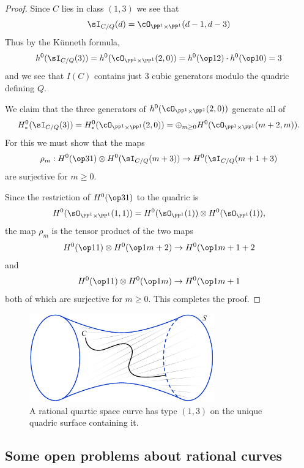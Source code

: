 \begin{proof}
Since $C$ lies in class $(1,3)$ we see that 
$$
\sI_{C/Q}(d) = \cO_{\PP^1\times \PP^1}(d-1, d-3)
%
$$
Thus by the K\"unneth formula,
$$
h^0(\sI_{C/Q}(3)) = h^0(\cO_{\PP^1\times \PP^1}(2, 0)) = h^0(\op12)\cdot h^0(\op10) = 3
$$
and we see that $I(C)$ contains just 3 cubic generators modulo the quadric defining $Q$. 

We claim that the three generators of $h^0(\cO_{\PP^1\times \PP^1}(2, 0))$ generate all of
$$
H^0_{*}(\sI_{C/Q}(3)) = H^0_{*}(\cO_{\PP^1\times \PP^1}(2, 0)) = 
\oplus_{m\geq 0}H^{0}(\cO_{\PP^1\times \PP^1}(m+2,m)).
$$
For this we must show that the maps
$$
\rho_{m}: H^{0}(\op31) \otimes H^0(\sI_{C/Q}(m+3)) \to H^0(\sI_{C/Q}(m+1+3)
$$
are surjective for $m\geq 0$.

Since the restriction
of $H^0(\op31)$ to the quadric is 
$$
H^0(\sO_{\PP^1\times \PP^1}(1,1)) = H^{0}(\sO_{\PP^{1}}(1)) \otimes H^{0}(\sO_{\PP^{1}}(1)),
$$
the map $\rho_{m}$
is the tensor product of the two maps
$$
H^{0}(\op11)\otimes H^{0}(\op1{m+2}) \to H^{0}(\op1{m+1+2}
$$
and 
$$
H^{0}(\op11)\otimes H^{0}(\op1{m}) \to H^{0}(\op1{m+1}
$$
both of which are surjective for $m\geq 0$. This completes the proof.
%
%
\end{proof}

\begin{figure}
\inprogress
\centerline{\includegraphics[height=1.5in]{"main/Fig03-1"}}
 \caption{A rational quartic space curve has type $(1,3)$ on the unique quadric surface containing it.}
\end{figure}


\subsection{Some open problems about rational curves}

